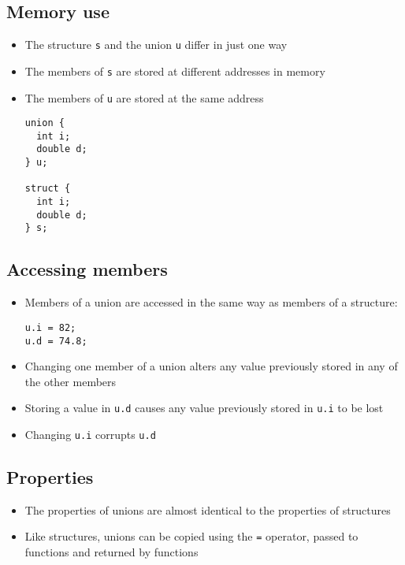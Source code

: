 \documentclass{article}
\begin{document}
\subsection{Memory use}
\begin{itemize}
\item The structure \verb!s! and the union \verb!u! differ in just one way
\item The members of \verb!s! are stored at different addresses in memory
\item The members of \verb!u! are stored at the same address

\begin{verbatim}
union {
  int i;
  double d;
} u;

struct {
  int i;
  double d;
} s;
\end{verbatim}
\end{itemize}



\subsection{Accessing members}
\begin{itemize}
\item Members of a union are accessed in the same way as members of a structure:
\begin{verbatim}
u.i = 82;
u.d = 74.8;
\end{verbatim}
\item Changing one member of a union alters any value previously stored in any of the other members
\item Storing a value in \verb!u.d! causes any value previously stored in \verb!u.i! to be lost
\item Changing \verb!u.i! corrupts \verb!u.d!
\end{itemize}



\subsection{Properties}
\begin{itemize}
\item The properties of unions are almost identical to the properties of structures

\item Like structures, unions can be copied using the \verb!=! operator, passed to functions and returned by functions
\end{itemize}
\end{document}
